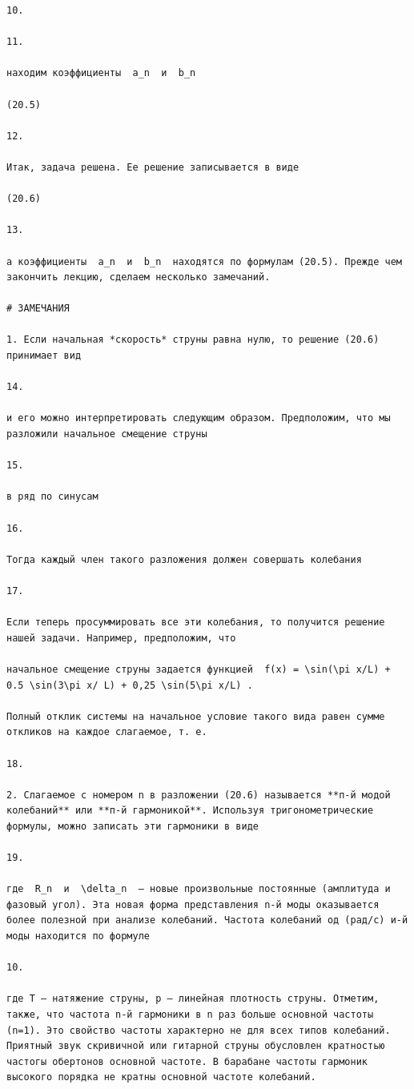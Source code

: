 \documentclass[
  ukrainian,
]{article}
\begin{document}
\begin{verbatim}
10.

11.

находим коэффициенты  a_n  и  b_n 

(20.5)

12.

Итак, задача решена. Ее решение записывается в виде

(20.6)

13.

а коэффициенты  a_n  и  b_n  находятся по формулам (20.5). Прежде чем закончить лекцию, сделаем несколько замечаний.

# ЗАМЕЧАНИЯ

1. Если начальная *скорость* струны равна нулю, то решение (20.6) принимает вид

14.

и его можно интерпретировать следующим образом. Предположим, что мы разложили начальное смещение струны

15.

в ряд по синусам

16.

Тогда каждый член такого разложения должен совершать колебания

17.

Если теперь просуммировать все эти колебания, то получится решение нашей задачи. Например, предположим, что

начальное смещение струны задается функцией  f(x) = \sin(\pi x/L) + 0.5 \sin(3\pi x/ L) + 0,25 \sin(5\pi x/L) .

Полный отклик системы на начальное условие такого вида равен сумме откликов на каждое слагаемое, т. е.

18.

2. Слагаемое с номером n в разложении (20.6) называется **п-й модой колебаний** или **п-й гармоникой**. Используя тригонометрические формулы, можно записать эти гармоники в виде

19.

где  R_n  и  \delta_n  — новые произвольные постоянные (амплитуда и фазовый угол). Эта новая форма представления n-й моды оказывается более полезной при анализе колебаний. Частота колебаний од (рад/с) и-й моды находится по формуле

10.

где Т — натяжение струны, р — линейная плотность струны. Отметим, также, что частота n-й гармоники в n раз больше основной частоты (n=1). Это свойство частоты характерно не для всех типов колебаний. Приятный звук скривичной или гитарной струны обусловлен кратностью частогы обертонов основной частоте. В барабане частоты гармоник высокого порядка не кратны основной частоте колебаний.


\end{verbatim}
\end{document}
